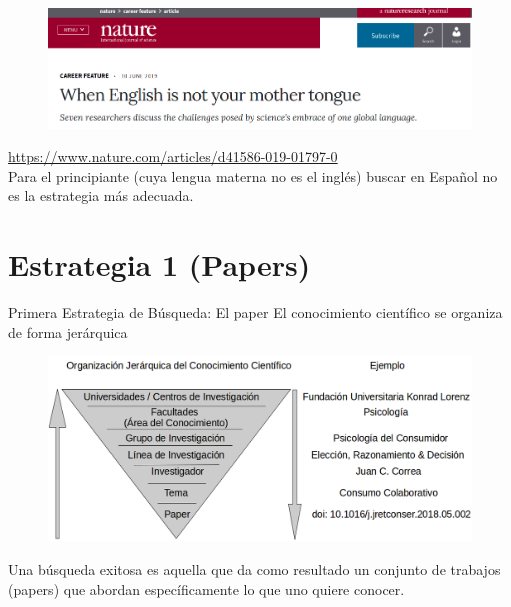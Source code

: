\documentclass[9pt]{beamer}
\begin{document}
\begin{frame}
\begin{figure}
\centering
 \includegraphics[width=.9\textwidth]{b3}
\end{figure}
\color{blue!46!green}
\url{https://www.nature.com/articles/d41586-019-01797-0}\\
\vspace{0.5cm}
\color{gray!72!black}
Para el principiante (cuya lengua materna no es el inglés) buscar en Español no es la estrategia más adecuada.
\end{frame}
    
\section{Estrategia 1 (Papers)}
\begin{frame}{Primera Estrategia de Búsqueda: El paper}
El conocimiento científico se organiza de forma jerárquica
\begin{figure}
\centering
\includegraphics[width=.9\textwidth]{b4}
\end{figure}
Una búsqueda exitosa es aquella que da como resultado un conjunto de trabajos (papers) que abordan específicamente lo que uno quiere conocer.
\end{frame}
\end{document}
